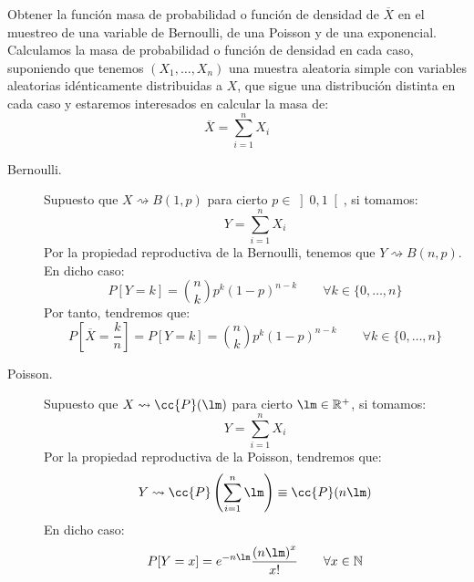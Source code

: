 \begin{ejercicio}
    Obtener la función masa de probabilidad o función de densidad de $\overline{X}$ en el muestreo de una variable de Bernoulli, de una Poisson y de una exponencial.\\

    \noindent
    Calculamos la masa de probabilidad o función de densidad en cada caso, suponiendo que tenemos $(X_1, \ldots, X_n)$ una muestra aleatoria simple con variables aleatorias idénticamente distribuidas a $X$, que sigue una distribución distinta en cada caso y estaremos interesados en calcular la masa de:
    \begin{equation*}
        \overline{X} = \sum_{i=1}^{n} X_i
    \end{equation*}
    \begin{description}
        \item [Bernoulli.] Supuesto que $X\rightsquigarrow B(1,p)$ para cierto $p\in \left]0,1\right[$, si tomamos:
            \begin{equation*}
                Y = \sum_{i=1}^{n}X_i
            \end{equation*}
            Por la propiedad reproductiva de la Bernoulli, tenemos que $Y\rightsquigarrow B(n,p)$. En dicho caso:
            \begin{equation*}
                P[Y=k] = \binom{n}{k} p^k {(1-p)}^{n-k} \qquad \forall k\in \{0,\ldots,n\}
            \end{equation*}
            Por tanto, tendremos que:
            \begin{equation*}
                P\left[\overline{X} = \frac{k}{n}\right] = P[Y=k] = \binom{n}{k} p^k {(1-p)}^{n-k} \qquad \forall k\in \{0,\ldots,n\}
            \end{equation*}
        \item [Poisson.] Supuesto que $X\rightsquigarrow \cc{P}(\lm)$ para cierto $\lm\in \mathbb{R}^+$, si tomamos:
            \begin{equation*}
                Y = \sum_{i=1}^{n}X_i
            \end{equation*}
            Por la propiedad reproductiva de la Poisson, tendremos que:
            \begin{equation*}
                Y\rightsquigarrow\cc{P}\left(\sum_{i=1}^{n}\lm\right) \equiv \cc{P}(n\lm)
            \end{equation*}
            En dicho caso:
            \begin{equation*}
                P[Y=x] = e^{-n\lm} \dfrac{{(n\lm)}^{x}}{x!} \qquad \forall x\in \mathbb{N}

\end{equation*}
\end{description}
\end{ejercicio}
